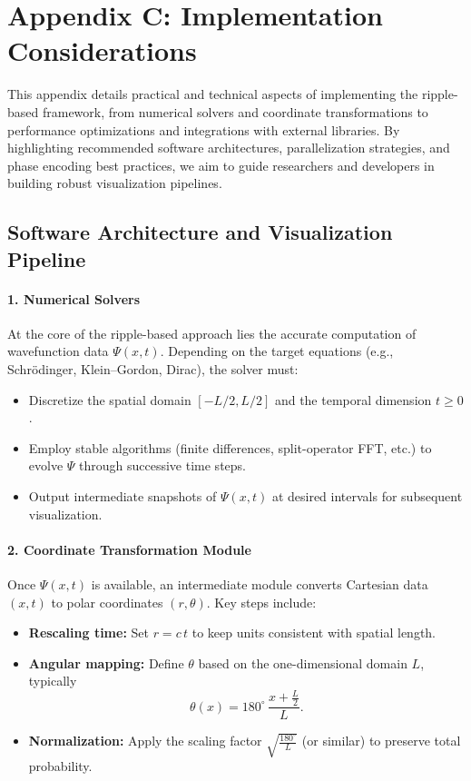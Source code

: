 
\section{Appendix C: Implementation Considerations}
\label{appendix:C}

This appendix details practical and technical aspects of implementing the ripple-based framework, from numerical solvers and coordinate transformations to performance optimizations and integrations with external libraries. By highlighting recommended software architectures, parallelization strategies, and phase encoding best practices, we aim to guide researchers and developers in building robust visualization pipelines.

\subsection{Software Architecture and Visualization Pipeline}

\paragraph{1. Numerical Solvers}
At the core of the ripple-based approach lies the accurate computation of wavefunction data \(\Psi(x,t)\). Depending on the target equations (e.g., Schr\"odinger, Klein--Gordon, Dirac), the solver must:
\begin{itemize}
    \item Discretize the spatial domain \([-L/2, L/2]\) and the temporal dimension \(t \ge 0\).
    \item Employ stable algorithms (finite differences, split-operator FFT, etc.) to evolve \(\Psi\) through successive time steps.
    \item Output intermediate snapshots of \(\Psi(x,t)\) at desired intervals for subsequent visualization.
\end{itemize}

\paragraph{2. Coordinate Transformation Module}
Once \(\Psi(x,t)\) is available, an intermediate module converts Cartesian data \((x,t)\) to polar coordinates \((r,\theta)\). Key steps include:
\begin{itemize}
    \item \textbf{Rescaling time:} Set \(r = c \, t\) to keep units consistent with spatial length.
    \item \textbf{Angular mapping:} Define \(\theta\) based on the one-dimensional domain \(L\), typically
    \[
       \theta(x) = 180^\circ \,\frac{x + \tfrac{L}{2}}{L}.
    \]
    \item \textbf{Normalization:} Apply the scaling factor \(\sqrt{\tfrac{180^\circ}{L}}\) (or similar) to preserve total probability.
\end{itemize}

